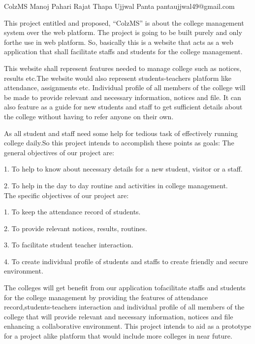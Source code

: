  \begin{conf-abstract}[]
 {ColzMS}
 {Manoj Pahari
 Rajat Thapa
 Ujjwal Panta
 }
{pantaujjwal49@gmail.com}

This project entitled and proposed, “ColzMS” is about the college management system over the web platform. The project is going to be built purely and only forthe use in web platform. So, basically this is a website that acts as a web application that shall facilitate staffs and students for the college management.

This website shall represent features needed to manage college such as notices, results etc.The website would also represent students-teachers platform like attendance, assignments etc. Individual profile of all members of the college will be made to provide relevant and necessary information, notices and file. It can also feature as a guide for new students and staff to get sufficient details about the college without having to refer anyone on their own.

As all student and staff need some help for  tedious task of effectively running college daily.So this project intends to accomplish these points as goals:
The general objectives of our project are:

1.	To help to know about necessary details for a new student, visitor or a staff.

2.	To help in the day to day routine and activities in college management.
\\
The specific objectives of our project are: 

1.	To keep the attendance record of students.

2.	To provide relevant notices, results, routines.

3.	To facilitate student teacher interaction.

4.	To create individual profile of students and staffs to create friendly and secure environment.

The colleges will get benefit from our application tofacilitate staffs and students for the college management by providing the features of attendance record,students-teachers interaction and individual profile of all members of the college that will provide relevant and necessary information, notices and file enhancing a collaborative environment.
This project intends to aid as a prototype for a project alike platform that would include more colleges in near future.

 \end{conf-abstract}